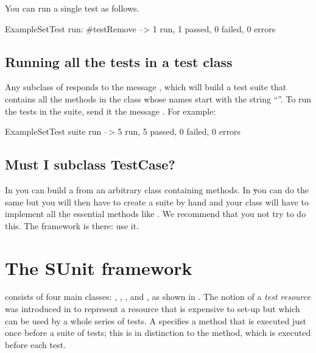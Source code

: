 \documentclass[a4paper,10pt,twoside]{book}
\begin{document}
You can run a single test as follows.

\begin{code}{}
ExampleSetTest run: #testRemove --> 1 run, 1 passed, 0 failed, 0 errors
\end{code}

\subsection{Running all the tests in a test class}

Any subclass of  responds to the message , which will build a test suite that contains all the
methods in the class whose names start with the string ``''.
To run the tests in the suite, send it the message .
For example:

\begin{code}{}
ExampleSetTest suite run --> 5 run, 5 passed, 0 failed, 0 errors
\end{code}

\subsection{Must I subclass TestCase?}

In \JUnit{} you can build a  from an arbitrary class
containing  methods.  In \st you can do the same
but you will then have to create a suite by hand and your class will
have to implement all the essential  methods like .
We recommend that you not try to do this.  The framework is there: use it.
\section{The SUnit framework}

\sunit consists of four main classes: ,
, , and , as shown in .
The notion of a \emph{test resource} was introduced in  to represent a resource that is expensive to set-up but which can be used by
a whole series of tests.  A 
specifies a  method that is executed just once before a suite of tests;
this is in distinction to the  method, which is executed before
each test.
\end{document}
